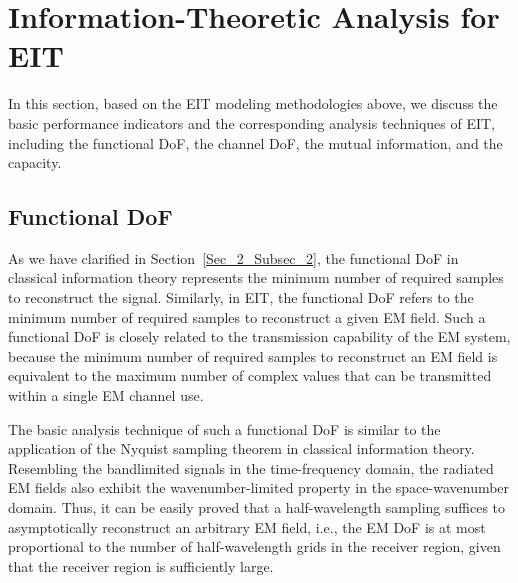 \documentclass[journal,twocolumn]{IEEEtran}
\begin{document}
\section{Information-Theoretic Analysis for EIT}
In this section, based on the EIT modeling methodologies above, we discuss the basic performance indicators and the corresponding analysis techniques of EIT, including the functional DoF, the channel DoF, the mutual information, and the capacity. 


\subsection{Functional DoF}\label{Sec_4_Subsec_1}
As we have clarified in Section~\ref{Sec_2_Subsec_2}, the functional DoF in classical information theory represents the minimum number of required samples to reconstruct the signal. Similarly, in EIT, the functional DoF refers to the minimum number of required samples to reconstruct a given EM field. 
Such a functional DoF is closely related to the transmission capability of the EM system, because the minimum number of required samples to reconstruct an EM field is equivalent to the maximum number of complex values that can be transmitted within a single EM channel use. 

The basic analysis technique of such a functional DoF is similar to the application of the Nyquist sampling theorem in classical information theory. 
Resembling the bandlimited signals in the time-frequency domain, the radiated EM fields also exhibit the wavenumber-limited property in the space-wavenumber domain. 
Thus, it can be easily proved that a half-wavelength sampling suffices to asymptotically reconstruct an arbitrary EM field, i.e., the EM DoF is at most proportional to the number of half-wavelength grids in the receiver region, given that the receiver region is sufficiently large. 
\end{document}
